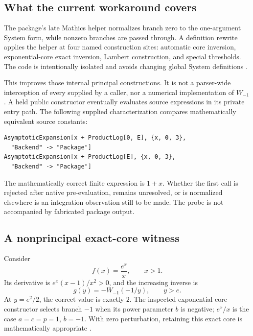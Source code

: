 \documentclass[11pt,a4paper]{article}
\newcommand{\code}[1]{\texttt{\detokenize{#1}}}
\theoremstyle{remark}
\begin{document}
\subsection{What the current workaround covers}

The package's late Mathics helper normalizes branch zero to the one-argument System form, while nonzero branches are passed through. A definition rewrite applies the helper at four named construction sites: automatic core inversion, exponential-core exact inversion, Lambert construction, and special thresholds. The code is intentionally isolated and avoids changing global System definitions \cite{mathicscorefunctions}.

This improves those internal principal constructions. It is not a parser-wide interception of every \code{ProductLog[0,z]} supplied by a caller, nor a numerical implementation of $W_{-1}$. A held public constructor eventually evaluates source expressions in its private entry path. The following supplied characterization compares mathematically equivalent source constants:
\begin{lstlisting}
AsymptoticExpansion[x + ProductLog[0, E], {x, 0, 3},
  "Backend" -> "Package"]
AsymptoticExpansion[x + ProductLog[E], {x, 0, 3},
  "Backend" -> "Package"]
\end{lstlisting}
The mathematically correct finite expression is $1+x$. Whether the first call is rejected after native pre-evaluation, remains unresolved, or is normalized elsewhere is an integration observation still to be made. The probe is not accompanied by fabricated package output.

\subsection{A nonprincipal exact-core witness}

Consider
\[
 f(x)=\frac{e^x}{x},\qquad x>1.
\]
Its derivative is $e^x(x-1)/x^2>0$, and the increasing inverse is
\begin{equation}\label{eq:minusonecore}
 g(y)=-W_{-1}(-1/y),\qquad y>e.
\end{equation}
At $y=e^2/2$, the correct value is exactly $2$. The inspected exponential-core constructor selects branch $-1$ when its power parameter $b$ is negative; $e^x/x$ is the case $a=c=p=1$, $b=-1$. With zero perturbation, retaining this exact core is mathematically appropriate \cite{expcore}.
\end{document}
